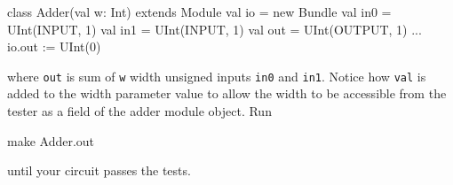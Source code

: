 \begin{scala}
class Adder(val w: Int) extends Module {
  val io = new Bundle {
    val in0 = UInt(INPUT,  1)
    val in1 = UInt(INPUT,  1)
    val out = UInt(OUTPUT, 1)
  }
  ...
  io.out := UInt(0)
}
\end{scala}

\noindent
where \verb+out+ is sum of \verb+w+ width unsigned inputs \verb+in0+ and \verb+in1+.  
Notice how \verb+val+ is added to the width parameter value to 
allow the width to be accessible from the tester as a field of the adder module object.  Run 

\begin{bash}
make Adder.out
\end{bash}

\noindent 
until your circuit passes the tests.


%
%


%
%
%
